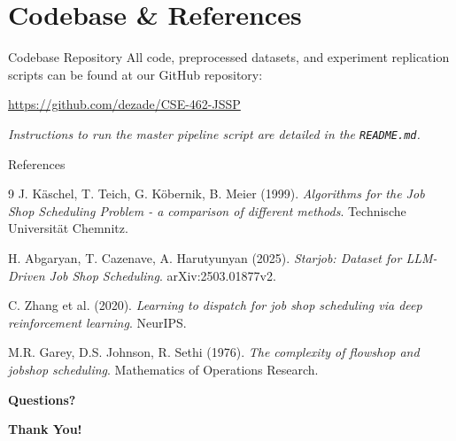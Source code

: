 \documentclass{beamer}
\begin{document}
\section{Codebase \& References}

\begin{frame}{Codebase Repository}
    \centering
    \vspace{2em}
    All code, preprocessed datasets, and experiment replication scripts can be found at our GitHub repository:
    
    \vspace{1em}
    \Large \url{https://github.com/dezade/CSE-462-JSSP}
    
    \vspace{2em}
    \normalsize
    \textit{Instructions to run the master pipeline script are detailed in the \texttt{README.md}.}
\end{frame}

\begin{frame}{References}
    \begin{thebibliography}{9}
        J. Käschel, T. Teich, G. Köbernik, B. Meier (1999). 
        \textit{Algorithms for the Job Shop Scheduling Problem - a comparison of different methods}. 
        Technische Universität Chemnitz.
        
        H. Abgaryan, T. Cazenave, A. Harutyunyan (2025). 
        \textit{Starjob: Dataset for LLM-Driven Job Shop Scheduling}. 
        arXiv:2503.01877v2.
        
        C. Zhang et al. (2020).
        \textit{Learning to dispatch for job shop scheduling via deep reinforcement learning}.
        NeurIPS.
        
        M.R. Garey, D.S. Johnson, R. Sethi (1976).
        \textit{The complexity of flowshop and jobshop scheduling}.
        Mathematics of Operations Research.
    \end{thebibliography}
\end{frame}

\begin{frame}[plain]
    \centering
    \Huge \textbf{Questions?}
\end{frame}

\begin{frame}[plain]
    \centering
    \Huge \textbf{Thank You!}
\end{frame}
\end{document}
